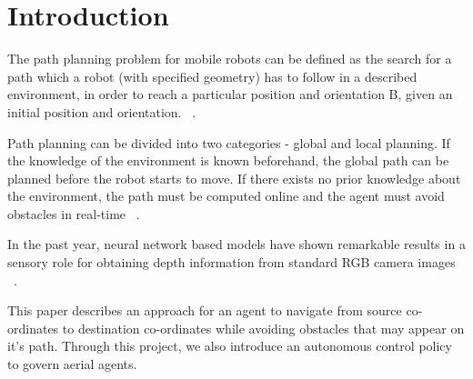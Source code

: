 \section{Introduction}
The path planning problem for mobile robots can be defined as the search for a path which a robot (with specified geometry) has to follow in a described environment, in order to reach a particular position and orientation B, given an initial position and orientation. ~\cite{Buniyamin_2011_IJSAED}.

Path planning can be divided into two categories - global and local planning. If the knowledge of the environment is known beforehand, the global path can be planned before the robot starts to move. If there exists no prior knowledge about the environment, the path must be computed online and the agent must avoid obstacles in real-time ~\cite{Buniyamin_2010_ICOSSSE}.

In the past year, neural network based models have shown remarkable results in a sensory role for obtaining depth information from standard RGB camera images ~\cite{Liu_2015_CVPR}.

This paper describes an approach for an agent to navigate from source co-ordinates to destination co-ordinates while avoiding obstacles that may appear on it's path. Through this project, we also introduce an autonomous control policy to govern aerial agents.


